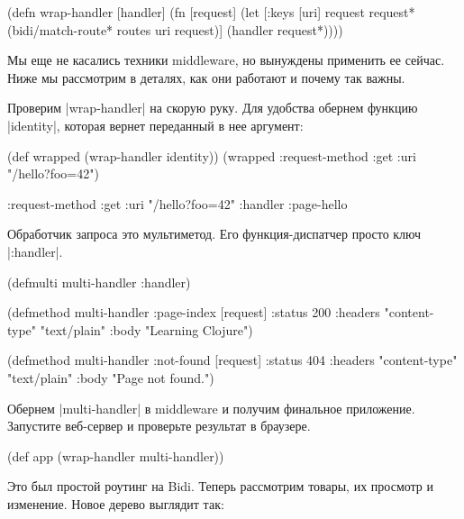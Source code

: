 \begin{english}
  \begin{clojure}
(defn wrap-handler [handler]
  (fn [request]
    (let [{:keys [uri]} request
          request* (bidi/match-route* routes uri request)]
      (handler request*))))
  \end{clojure}
\end{english}

Мы еще не касались техники middleware, но вынуждены применить ее сейчас. Ниже мы
рассмотрим в деталях, как они работают и почему так важны.

Проверим \spverb|wrap-handler| на скорую руку. Для удобства обернем функцию
\spverb|identity|, которая вернет переданный в нее аргумент:

\begin{english}
  \begin{clojure}
(def wrapped (wrap-handler identity))
(wrapped {:request-method :get
          :uri "/hello?foo=42"})

{:request-method :get
 :uri "/hello?foo=42"
 :handler :page-hello}
  \end{clojure}
\end{english}

Обработчик запроса это мультиметод. Его функция-диспатчер просто ключ
\spverb|:handler|.

\begin{english}
  \begin{clojure}
(defmulti multi-handler :handler)

(defmethod multi-handler :page-index
  [request]
  {:status 200
   :headers {"content-type" "text/plain"}
   :body "Learning Clojure"})

(defmethod multi-handler :not-found
  [request]
  {:status 404
   :headers {"content-type" "text/plain"}
   :body "Page not found."})
  \end{clojure}
\end{english}

Обернем \spverb|multi-handler| в middleware и получим финальное
приложение. Запустите веб-сервер и проверьте результат в браузере.

\begin{english}
  \begin{clojure}
(def app (wrap-handler multi-handler))
  \end{clojure}
\end{english}

Это был простой роутинг на Bidi. Теперь рассмотрим товары, их
просмотр и изменение. Новое дерево выглядит так:

